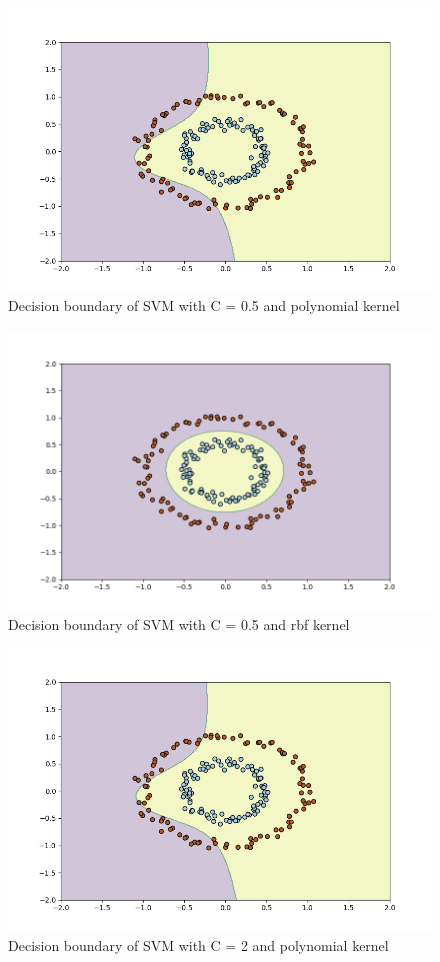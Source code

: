 \documentclass[12pt,a4paper, margin=1in]{article}
\begin{document}
\begin{figure}[H]
    \centering
    \includegraphics[scale=0.75]{svm-poly-05}
    \caption{Decision boundary of SVM with C = 0.5 and polynomial kernel}
\end{figure}
\begin{figure}[H]
    \centering
    \includegraphics[scale=0.75]{svm-rbf-05}
    \caption{Decision boundary of SVM with C = 0.5 and rbf kernel}
\end{figure}
\begin{figure}[H]
    \centering
    \includegraphics[scale=0.75]{svm-poly-2}
    \caption{Decision boundary of SVM with C = 2 and polynomial kernel}
\end{figure}
\end{document}
